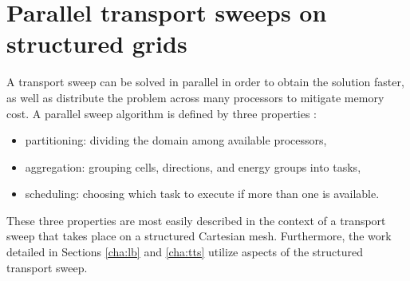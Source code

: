 \documentclass[times,final]{elsarticle}
\newcommand{\tcr}[1]{\textcolor{red}{#1}}
\begin{document}
\section{Parallel transport sweeps on structured grids}\label{cha:parallel_transport}

A transport sweep can be solved in parallel in order to obtain the solution faster, as well as distribute the problem across many processors to mitigate memory cost.
A parallel sweep algorithm is defined by three properties \cite{mpadams2013} :
\begin{itemize}
\item partitioning: dividing the domain among available processors,
\item aggregation: grouping cells, directions, and energy groups into tasks,
\item scheduling: choosing which task to execute if more than one is available.
\end{itemize}

These three properties are most easily described in the context of a  transport sweep that takes place on a structured Cartesian mesh.
Furthermore, the work detailed in Sections \ref{cha:lb} and \ref{cha:tts} utilize aspects of the structured transport sweep.
\end{document}
